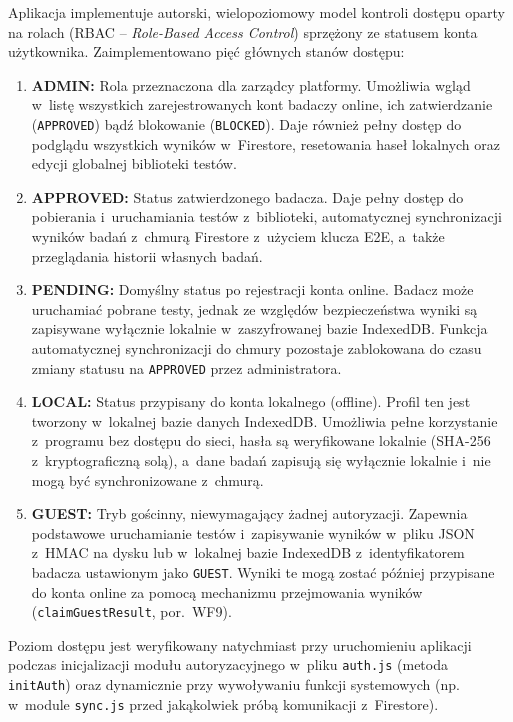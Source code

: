 \documentclass[12pt, a4paper, oneside]{report}
\begin{document}
Aplikacja implementuje autorski, wielopoziomowy model kontroli dostępu oparty na rolach (RBAC – \textit{Role-Based Access Control}) sprzężony ze statusem konta użytkownika. Zaimplementowano pięć głównych stanów dostępu:
\begin{enumerate}
	\item \textbf{ADMIN:} Rola przeznaczona dla zarządcy platformy. Umożliwia wgląd w~listę wszystkich zarejestrowanych kont badaczy online, ich zatwierdzanie (\texttt{APPROVED}) bądź blokowanie (\texttt{BLOCKED}). Daje również pełny dostęp do podglądu wszystkich wyników w~Firestore, resetowania haseł lokalnych oraz edycji globalnej biblioteki testów.
	\item \textbf{APPROVED:} Status zatwierdzonego badacza. Daje pełny dostęp do pobierania i~uruchamiania testów z~biblioteki, automatycznej synchronizacji wyników badań z~chmurą Firestore z~użyciem klucza E2E, a~także przeglądania historii własnych badań.
	\item \textbf{PENDING:} Domyślny status po rejestracji konta online. Badacz może uruchamiać pobrane testy, jednak ze względów bezpieczeństwa wyniki są zapisywane wyłącznie lokalnie w~zaszyfrowanej bazie IndexedDB. Funkcja automatycznej synchronizacji do chmury pozostaje zablokowana do czasu zmiany statusu na \texttt{APPROVED} przez administratora.
	\item \textbf{LOCAL:} Status przypisany do konta lokalnego (offline). Profil ten jest tworzony w~lokalnej bazie danych IndexedDB. Umożliwia pełne korzystanie z~programu bez dostępu do sieci, hasła są weryfikowane lokalnie (SHA-256 z~kryptograficzną solą), a~dane badań zapisują się wyłącznie lokalnie i~nie mogą być synchronizowane z~chmurą.
	\item \textbf{GUEST:} Tryb gościnny, niewymagający żadnej autoryzacji. Zapewnia podstawowe uruchamianie testów i~zapisywanie wyników w~pliku JSON z~HMAC na dysku lub w~lokalnej bazie IndexedDB z~identyfikatorem badacza ustawionym jako \texttt{GUEST}. Wyniki te mogą zostać później przypisane do konta online za pomocą mechanizmu przejmowania wyników (\texttt{claimGuestResult}, por.~WF9).
\end{enumerate}

Poziom dostępu jest weryfikowany natychmiast przy uruchomieniu aplikacji podczas inicjalizacji modułu autoryzacyjnego w~pliku \texttt{auth.js} (metoda \texttt{initAuth}) oraz dynamicznie przy wywoływaniu funkcji systemowych (np. w~module \texttt{sync.js} przed jakąkolwiek próbą komunikacji z~Firestore).
\end{document}
